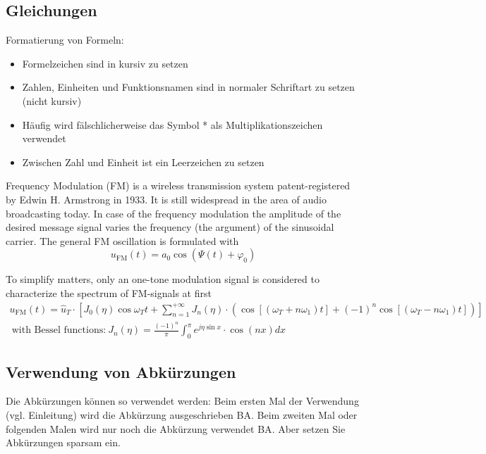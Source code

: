 \documentclass[12pt,a4paper,bibliography=totoc,listof=totoc]{scrartcl}
\begin{document}
\vspace{1em}
%


\subsection{Gleichungen}
Formatierung von Formeln:
\begin{itemize}
  \item Formelzeichen sind in kursiv zu setzen
  \item Zahlen, Einheiten und Funktionsnamen sind in normaler Schriftart zu setzen (nicht kursiv)
  \item Häufig wird fälschlicherweise das Symbol * als Multiplikationszeichen verwendet
  \item Zwischen Zahl und Einheit ist ein Leerzeichen zu setzen
\end{itemize}

Frequency Modulation (FM) is a wireless transmission system patent-registered by Edwin H. Armstrong in 1933. It is still widespread in the area of audio broadcasting today. In case of the frequency modulation the amplitude of the desired message signal varies the frequency (the argument) of the sinusoidal carrier. The general FM oscillation is formulated with 
\begin{equation}
u_{\textrm{FM}}(t)= a_0 \cos(\Psi(t)+\varphi_0) 
\label{eqn:fmosc}
\end{equation}

To simplify matters, only an one-tone modulation signal is considered to characterize the spectrum of FM-signals at first
\begin{multline}
u_{\textrm{FM}}(t)=\hat u_T \cdot [J_0(\eta)\cos\omega_Tt + \sum_{n=1}^{+\infty} J_n(\eta) \cdot (\cos[(\omega_T+n\omega_1)t]+(-1)^n \cos[(\omega_T-n\omega_1)t])] 
\\ \ \mbox{with Bessel functions:} \ J_n(\eta)= \frac{(-1)^n}{\pi} \int_0^{\pi} e^{j\eta\sin x} \cdot \cos(nx) dx 
\end{multline}

\subsection{Verwendung von Abkürzungen}
Die Abkürzungen können so verwendet werden:
Beim ersten Mal der Verwendung (vgl. Einleitung) wird die Abkürzung ausgeschrieben \ac{BA}. Beim zweiten Mal oder folgenden Malen wird nur noch die Abkürzung verwendet \ac{BA}.
Aber setzen Sie Abkürzungen sparsam ein.
\end{document}
